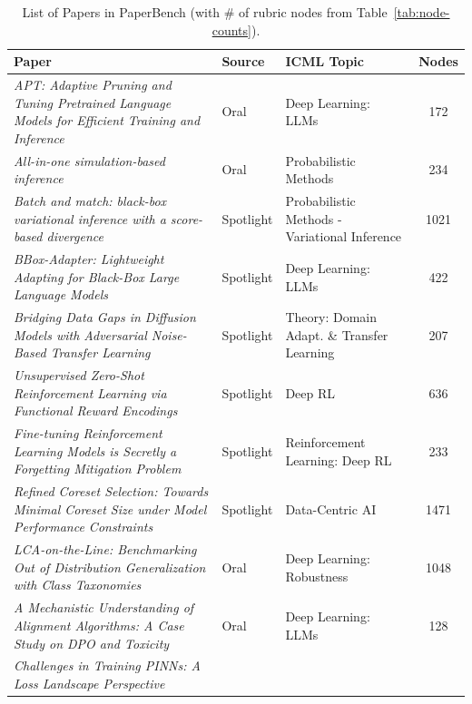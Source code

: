 \documentclass{article}
\theoremstyle{plain}
\theoremstyle{definition}
\theoremstyle{remark}
\begin{document}
\begin{table}[h]
\centering
\caption{List of Papers in PaperBench (with \# of rubric nodes from Table~\ref{tab:node-counts}).}
\label{tab:papers-with-nodes}
\renewcommand{\arraystretch}{1.1}
\setlength{\tabcolsep}{4pt}
\begin{small}
\begin{tabular}{%
  m{11cm}           %
  m{1.3cm}         %
  m{3cm}<{\raggedright}  %
  c                %
}
\toprule
\textbf{Paper} & \textbf{Source} & \textbf{ICML Topic} & \textbf{Nodes} \\
\midrule
\emph{APT: Adaptive Pruning and Tuning Pretrained Language Models for Efficient Training and Inference} 
   & Oral 
   & Deep Learning: LLMs 
   & 172 \\
\emph{All-in-one simulation-based inference}
   & Oral 
   & Probabilistic Methods 
   & 234 \\
\emph{Batch and match: black-box variational inference with a score-based divergence} 
   & Spotlight 
   & Probabilistic Methods - Variational Inference
   & 1021 \\
\emph{BBox-Adapter: Lightweight Adapting for Black-Box Large Language Models} 
   & Spotlight 
   & Deep Learning: LLMs
   & 422 \\
\emph{Bridging Data Gaps in Diffusion Models with Adversarial Noise-Based Transfer Learning} 
   & Spotlight 
   & Theory: Domain Adapt. \& Transfer Learning 
   & 207 \\
\emph{Unsupervised Zero-Shot Reinforcement Learning via Functional Reward Encodings}
   & Spotlight 
   & Deep RL 
   & 636 \\
\emph{Fine-tuning Reinforcement Learning Models is Secretly a Forgetting Mitigation Problem} 
   & Spotlight 
   & Reinforcement Learning: Deep RL
   & 233 \\
\emph{Refined Coreset Selection: Towards Minimal Coreset Size under Model Performance Constraints} 
   & Spotlight 
   & Data-Centric AI
   & 1471 \\
\emph{LCA-on-the-Line: Benchmarking Out of Distribution Generalization with Class Taxonomies} 
   & Oral 
   & Deep Learning: Robustness 
   & 1048 \\
\emph{A Mechanistic Understanding of Alignment Algorithms: A Case Study on DPO and Toxicity}
   & Oral 
   & Deep Learning: LLMs
   & 128 \\
\emph{Challenges in Training PINNs: A Loss Landscape Perspective} 

\end{tabular}
\end{small}
\end{table}
\end{document}
